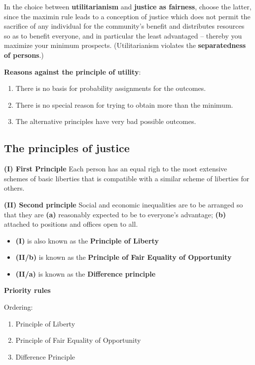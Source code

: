 In the choice between \textbf{utilitarianism} and \textbf{justice as fairness},
choose the latter, since the maximin rule leads to a conception of justice
which does not permit the sacrifice of any individual for the community's
benefit and distributes resources so as to benefit everyone, and in particular
the least advantaged -- thereby you maximize your minimum prospects.
(Utilitarianism violates the \textbf{separatedness of persons}.)

\textbf{Reasons against the principle of utility}:

\begin{enumerate}
	\item There is no basis for probability assignments for the outcomes.
	\item There is no special reason for trying to obtain more than the
	minimum.
	\item The alternative principles have very bad possible outcomes.
\end{enumerate}

\subsection{The principles of justice}

\textbf{(I) First Principle} Each person has an equal righ to the most
extensive schemes of basic liberties that is compatible with a similar scheme
of liberties for others.

\textbf{(II) Second principle} Social and economic inequalities are to be
arranged so that they are \textbf{(a)} reasonably expected to be to everyone's
advantage; \textbf{(b)} attached to positions and offices open to all.

\begin{itemize}
	\item \textbf{(I)} is also known as the \textbf{Principle of Liberty}
	\item \textbf{(II/b)} is known as the \textbf{Principle of Fair
	Equality of Opportunity}
	\item \textbf{(II/a)} is known as the \textbf{Difference principle}
\end{itemize}

\textbf{Priority rules}

Ordering:
\begin{enumerate}
	\item Principle of Liberty
	\item Principle of Fair Equality of Opportunity
	\item Difference Principle
\end{enumerate}

